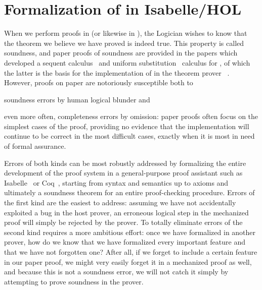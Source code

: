 \documentclass[12pt]{cmuthesis}
\theoremstyle{definition}
\theoremstyle{remark}
\newcommand{\Isabelle}{Isabelle/HOL\xspace}
\begin{document}
\section{Formalization of \dL in \Isabelle}
\label{sec:isabelle-fml}
When we perform proofs in \dL (or likewise in \dGL), the Logician wishes to know that the theorem we believe we have proved is indeed true.
This property is called soundness, and paper proofs of soundness are provided in the papers which developed a sequent calculus~\cite{DBLP:journals/jar/Platzer08} and uniform substitution~\cite{DBLP:journals/jar/Platzer17} calculus for \dL, of which the latter is the basis for the implementation of \dL in the theorem prover \KeYmaeraX~\cite{DBLP:conf/cade/FultonMQVP15}.
However, proofs on paper are notoriously susceptible both to
\begin{inparaenum}[i)]
  \item soundness errors by human logical blunder and
  \item even more often, completeness errors by omission: 
    paper proofs often focus on the simplest cases of the proof, providing no evidence that the implementation will continue to be correct in the most difficult cases, exactly when it is most in need of formal assurance.
\end{inparaenum}
Errors of both kinds can be most robustly addressed by formalizing the entire development of the proof system in a general-purpose proof assistant such as Isabelle~\cite{DBLP:books/sp/NipkowPW02} or Coq~\cite{COQ}, starting from syntax and semantics up to axioms and ultimately a soundness theorem for an entire proof-checking procedure.
Errors of the first kind are the easiest to address: assuming we have not accidentally exploited a bug in the host prover, an erroneous logical step in the mechanized proof will simply be rejected by the prover.
To totally eliminate errors of the second kind requires a more ambitious effort: once we have formalized \dL in another prover, how do we know that we have formalized every important feature and that we have not forgotten one?
After all, if we forget to include a certain feature in our paper proof, we might very easily forget it in a mechanized proof as well, and because this is not a soundness error, we will not catch it simply by attempting to prove soundness in the prover.
\end{document}
